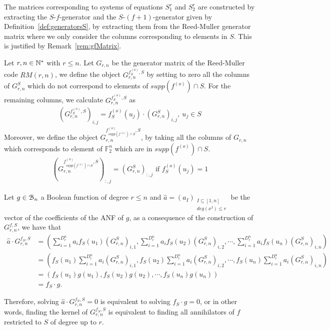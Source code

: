 \documentclass[11pt]{llncs}
\begin{document}
The matrices corresponding to systems of equations $S_1^r$ and $S_2^r$ are constructed by extracting the $S$-$f$-generator and the $S$-$(f+1)$-generator given by Definition~\ref{def:generatorsS}, by extracting them from the Reed-Muller generator matrix where we only consider the columns corresponding to elements in $S$. 
This is justified by Remark~\ref{rem:gfMatrix}.



\begin{definition}\label{def:generatorsS}
Let $r,n\in\mathbb{N}^*$ with $r\leq n$. Let $G_{r,n}$ be the generator matrix of the Reed-Muller code $RM(r,n)$, we define the object $G_{r,n}^{f^{(o)}_S,S}$ by setting to zero all the columns of $G_{r,n}^S$ which do not correspond to elements of $supp(f^{(o)} )\cap S$. For the remaining columns, we calculate $G_{r,n}^{f_S^{(o)},S}$ as
	\begin{align*}
	\left(G_{r,n}^{f^{(o)}_S,S}\right)_{i,j} = f_S^{(o)}(u_j) \cdot \left(G_{r,n}^S\right)_{i,j}, \ u_j \in S
	\end{align*}
	Moreover, we define the object $G_{r,n}^{f^{(o)}_{supp\left(f^{(o)}\right) \cap S},S}$, by taking all the columns of $G_{r,n}$ which corresponds to element of $\mathbb{F}_2^n$ which are in $supp\left(f^{(o)}\right) \cap S$.
	\begin{align}
	\left(G_{r,n}^{f_{supp\left(f^{(o)}\right) \cap S}^{(o)},S}\right)_{:,j} = (G_{r,n}^S)_{:,j} \mbox{ if } f_S^{(o)}(u_j) = 1 \label{eq:f-generatorRestrictedSet}
	\end{align}
\end{definition}

\begin{remark}\label{rem:gfMatrix}
	Let $g \in \mathcal{B}_{n}$ a Boolean function of degree $r\leq n$ and $\hat{a} = \left(a_I\right)_{\substack{I \subseteq [1,n] \\ deg\left(x^I\right) \leq r}}$ be the vector of the coefficients of the ANF of $g$, as a consequence of the construction of $G_{r,n}^{f,S}$, we have that
	\begin{equation}
	\begin{aligned}
	\hat{a} \cdot G_{r,n}^{f_S,S} & = \left(\sum_{i=1}^{D_r^n}a_i f_S(u_1)(G_{r,n}^S)_{i,1}, \sum_{i=1}^{D_r^n}a_i f_S(u_2)(G_{r,n}^S)_{i,2}, \cdots, \sum_{i=1}^{D_r^n}a_i f_S(u_n)(G_{r,n}^S)_{i,n}\right)     \\
	& =  \left(f_S(u_1) \sum_{i=1}^{D_r^n}a_i (G_{r,n}^S)_{i,1}, f_S(u_2) \sum_{i=1}^{D_r^n}a_i (G_{r,n}^S)_{i,2}, \cdots, f_S(u_n) \sum_{i=1}^{D_r^n}a_i (G_{r,n}^S)_{i,n}\right) \\
	& = \left(f_S(u_1) g(u_1), f_S(u_2) g(u_2), \cdots, f_S(u_n) g(u_n)\right)                                                                                      \\
	& = f_S \cdot g.
	\end{aligned}
	\end{equation}
	
	Therefore, solving $ \hat{a} \cdot G_{r,n}^{f_S,S} = 0$ is equivalent to solving $f_S \cdot g = 0$, or in other words, finding the kernel of $G_{r,n}^{f_S,S}$ is equivalent to finding all annihilators of $f$ restricted to $S$ of degree up to $r$.
\end{remark}
\end{document}
